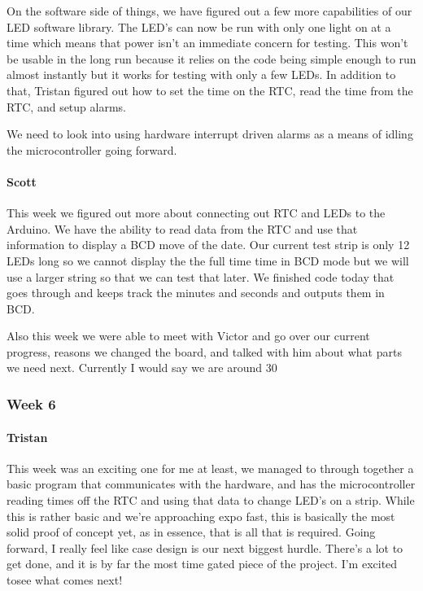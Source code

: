 \documentclass[onecolumn, draftclsnofoot,10pt, compsoc]{IEEEtran}
\begin{document}
On the software side of things, we have figured out a few more capabilities of our LED software library. The LED's can now be run with only one light on at a time which means that power isn't an immediate concern for testing. This won't be usable in the long run because it relies on the code being simple enough to run almost instantly but it works for testing with only a few LEDs. In addition to that, Tristan figured out how to set the time on the RTC, read the time from the RTC, and setup alarms.

We need to look into using hardware interrupt driven alarms as a means of idling the microcontroller going forward.
\paragraph{Scott}
This week we figured out more about connecting out RTC and LEDs to the Arduino. We have the ability to read data from the RTC and use that information to display a BCD move of the date. Our current test strip is only 12 LEDs long so we cannot display the the full time time in BCD mode but we will use a larger string so that we can test that later. We finished code today that goes through and keeps track the minutes and seconds and outputs them in BCD.

Also this week we were able to meet with Victor and go over our current progress, reasons we changed the board, and talked with him about what parts we need next. Currently I would say we are around 30%
\subsubsection{Week 6}
\paragraph{Tristan}
This week was an exciting one for me at least, we managed to through together a basic program that communicates with the hardware, and has the microcontroller reading times off the RTC and using that data to change LED's on a strip. While this is rather basic and we're approaching expo fast, this is basically the most solid proof of concept yet, as in essence, that is all that is required. Going forward, I really feel like case design is our next biggest hurdle. There's a lot to get done, and it is by far the most time gated piece of the project. I'm excited tosee what comes next!
\end{document}
